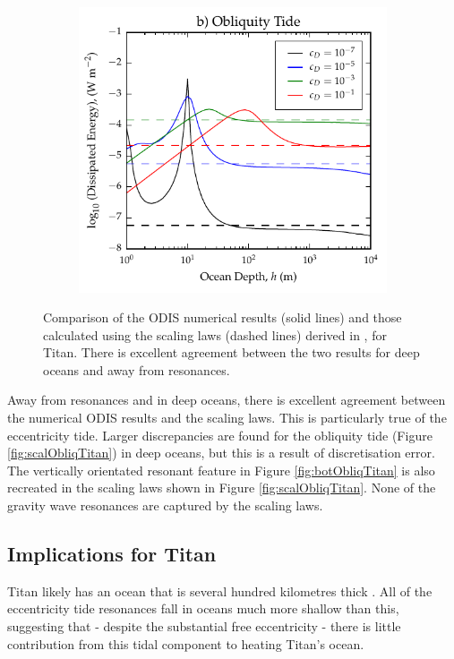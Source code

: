 \begin{figure}[!t]
\begin{subfigure}{0.4\linewidth}
\includegraphics[width=\linewidth]{Figures/Obliquity_scaling}
\subcaption{\label{fig:scalObliqTitan}}
\end{subfigure}
\vspace*{-0.8cm}
\caption{Comparison of the ODIS numerical results (solid lines) and those calculated using the scaling laws (dashed lines) derived in \citet{chen2013tidal}, for Titan. There is excellent agreement between the two results for deep oceans and away from resonances. \label{fig:scalTitan}}
\end{figure}

Away from resonances and in deep oceans, there is excellent agreement between the numerical ODIS results and the scaling laws. This is particularly true of the eccentricity tide. Larger discrepancies are found for the obliquity tide (Figure \ref{fig:scalObliqTitan}) in deep oceans, but this is a result of discretisation error. The vertically orientated resonant feature in Figure \ref{fig:botObliqTitan} is also recreated in the scaling laws shown in Figure \ref{fig:scalObliqTitan}. None of the gravity wave resonances are captured by the scaling laws. 

\subsection{Implications for Titan}

Titan likely has an ocean that is several hundred kilometres thick \citep{sohl2003interior}. All of the eccentricity tide resonances fall in oceans much more shallow than this, suggesting that - despite the substantial free eccentricity - there is little contribution from this tidal component to heating Titan's ocean.

